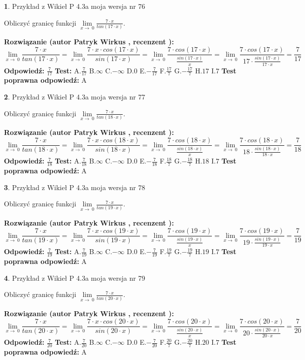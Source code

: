\documentclass[12pt, a4paper]{article}
\theoremstyle{definition} %
\newtheorem{zad}{}
\newcommand{\zadStart}[1]{\begin{zad}#1\newline}
\newcommand{\zadStop}{\end{zad}}
\newcommand{\rozwStart}[2]{\noindent \textbf{Rozwiązanie (autor #1 , recenzent #2): }\newline}
\newcommand{\rozwStop}{\newline}
\newcommand{\odpStart}{\noindent \textbf{Odpowiedź:}\newline}
\newcommand{\odpStop}{\newline}
\newcommand{\testStart}{\noindent \textbf{Test:}\newline}
\newcommand{\testStop}{\newline}
\newcommand{\kluczStart}{\noindent \textbf{Test poprawna odpowiedź:}\newline}
\newcommand{\kluczStop}{\newline}
\begin{document}
\zadStart{Przykład z Wikieł P 4.3a moja wersja nr 76}


Obliczyć granicę funkcji $\lim\limits_{x\to\ 0}\frac{7 \cdot x}{tan(17 \cdot x)}$.
\zadStop
\rozwStart{Patryk Wirkus}{}
$$\lim\limits_{x\to\ 0}\frac{7 \cdot x}{tan(17 \cdot x)}=\lim\limits_{x\to\ 0}\frac{7 \cdot x \cdot cos(17 \cdot x)}{sin(17 \cdot x)}=\lim\limits_{x\to\ 0}\frac{7 \cdot cos(17 \cdot x)}{\frac{sin(17 \cdot x)}{x}}=\lim\limits_{x\to\ 0}\frac{7 \cdot cos(17 \cdot x)}{17 \cdot \frac{sin(17 \cdot x)}{17 \cdot x}} = \frac{7}{17}$$
\rozwStop
\odpStart
$\frac{7}{17}$
\odpStop
\testStart
A.$\frac{7}{17}$
B.$\infty$
C.$-\infty$
D.$0$
E.$-\frac{7}{17}$
F.$\frac{17}{7}$
G.$-\frac{17}{7}$
H.$17$
I.$7$
\testStop
\kluczStart
A
\kluczStop



\zadStart{Przykład z Wikieł P 4.3a moja wersja nr 77}


Obliczyć granicę funkcji $\lim\limits_{x\to\ 0}\frac{7 \cdot x}{tan(18 \cdot x)}$.
\zadStop
\rozwStart{Patryk Wirkus}{}
$$\lim\limits_{x\to\ 0}\frac{7 \cdot x}{tan(18 \cdot x)}=\lim\limits_{x\to\ 0}\frac{7 \cdot x \cdot cos(18 \cdot x)}{sin(18 \cdot x)}=\lim\limits_{x\to\ 0}\frac{7 \cdot cos(18 \cdot x)}{\frac{sin(18 \cdot x)}{x}}=\lim\limits_{x\to\ 0}\frac{7 \cdot cos(18 \cdot x)}{18 \cdot \frac{sin(18 \cdot x)}{18 \cdot x}} = \frac{7}{18}$$
\rozwStop
\odpStart
$\frac{7}{18}$
\odpStop
\testStart
A.$\frac{7}{18}$
B.$\infty$
C.$-\infty$
D.$0$
E.$-\frac{7}{18}$
F.$\frac{18}{7}$
G.$-\frac{18}{7}$
H.$18$
I.$7$
\testStop
\kluczStart
A
\kluczStop



\zadStart{Przykład z Wikieł P 4.3a moja wersja nr 78}


Obliczyć granicę funkcji $\lim\limits_{x\to\ 0}\frac{7 \cdot x}{tan(19 \cdot x)}$.
\zadStop
\rozwStart{Patryk Wirkus}{}
$$\lim\limits_{x\to\ 0}\frac{7 \cdot x}{tan(19 \cdot x)}=\lim\limits_{x\to\ 0}\frac{7 \cdot x \cdot cos(19 \cdot x)}{sin(19 \cdot x)}=\lim\limits_{x\to\ 0}\frac{7 \cdot cos(19 \cdot x)}{\frac{sin(19 \cdot x)}{x}}=\lim\limits_{x\to\ 0}\frac{7 \cdot cos(19 \cdot x)}{19 \cdot \frac{sin(19 \cdot x)}{19 \cdot x}} = \frac{7}{19}$$
\rozwStop
\odpStart
$\frac{7}{19}$
\odpStop
\testStart
A.$\frac{7}{19}$
B.$\infty$
C.$-\infty$
D.$0$
E.$-\frac{7}{19}$
F.$\frac{19}{7}$
G.$-\frac{19}{7}$
H.$19$
I.$7$
\testStop
\kluczStart
A
\kluczStop



\zadStart{Przykład z Wikieł P 4.3a moja wersja nr 79}


Obliczyć granicę funkcji $\lim\limits_{x\to\ 0}\frac{7 \cdot x}{tan(20 \cdot x)}$.
\zadStop
\rozwStart{Patryk Wirkus}{}
$$\lim\limits_{x\to\ 0}\frac{7 \cdot x}{tan(20 \cdot x)}=\lim\limits_{x\to\ 0}\frac{7 \cdot x \cdot cos(20 \cdot x)}{sin(20 \cdot x)}=\lim\limits_{x\to\ 0}\frac{7 \cdot cos(20 \cdot x)}{\frac{sin(20 \cdot x)}{x}}=\lim\limits_{x\to\ 0}\frac{7 \cdot cos(20 \cdot x)}{20 \cdot \frac{sin(20 \cdot x)}{20 \cdot x}} = \frac{7}{20}$$
\rozwStop
\odpStart
$\frac{7}{20}$
\odpStop
\testStart
A.$\frac{7}{20}$
B.$\infty$
C.$-\infty$
D.$0$
E.$-\frac{7}{20}$
F.$\frac{20}{7}$
G.$-\frac{20}{7}$
H.$20$
I.$7$
\testStop
\kluczStart
A
\kluczStop
\end{document}
